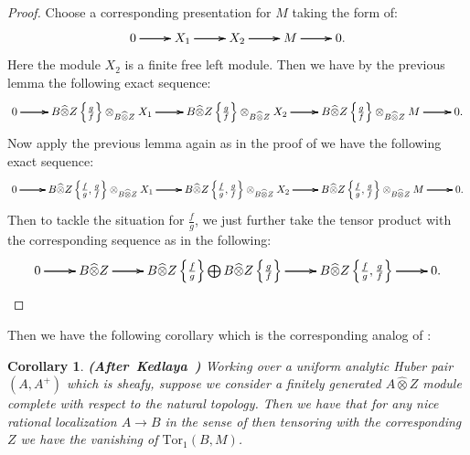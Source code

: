 \documentclass[12pt]{amsart}
\newtheorem{corollary}[theorem]{Corollary}
\theoremstyle{definition}
\numberwithin{equation}{section}
\begin{document}
\begin{proof}
Choose a corresponding presentation for $M$ taking the form of:
\[
\xymatrix@C+0pc@R+0pc{
0 \ar[r] \ar[r] \ar[r] &X_1 \ar[r] \ar[r] \ar[r] &X_2\ar[r] \ar[r] \ar[r] &M \ar[r] \ar[r] \ar[r] &0.
}
\]
Here the module $X_2$ is a finite free left module. Then we have by the previous lemma the following exact sequence:
\[
\xymatrix@C+0pc@R+0pc{
0 \ar[r] \ar[r] \ar[r] &B\widehat{\otimes}Z\left\{\frac{g}{f}\right\}\otimes_{B\widehat{\otimes}Z}X_1 \ar[r] \ar[r] \ar[r] &B\widehat{\otimes}Z\left\{\frac{g}{f}\right\}\otimes_{B\widehat{\otimes}Z}X_2 \ar[r] \ar[r] \ar[r] &B\widehat{\otimes}Z\left\{\frac{g}{f}\right\}\otimes_{B\widehat{\otimes}Z}M \ar[r] \ar[r] \ar[r] &0.
}
\]	
Now apply the previous lemma again as in the proof of \cite[Lemma 1.9.4]{Ked2} we have the following exact sequence:
\[
\xymatrix@C+0pc@R+0pc{
0 \ar[r] \ar[r] \ar[r] &B\widehat{\otimes}Z\left\{\frac{f}{g},\frac{g}{f}\right\}\otimes_{B\widehat{\otimes}Z}X_1 \ar[r] \ar[r] \ar[r] &B\widehat{\otimes}Z\left\{\frac{f}{g},\frac{g}{f}\right\}\otimes_{B\widehat{\otimes}Z}X_2 \ar[r] \ar[r] \ar[r] &B\widehat{\otimes}Z\left\{\frac{f}{g},\frac{g}{f}\right\}\otimes_{B\widehat{\otimes}Z}M \ar[r] \ar[r] \ar[r] &0.
}
\]	
Then to tackle the situation for $\frac{f}{g}$, we just further take the tensor product with the corresponding sequence as in the following:
\[
\xymatrix@C+0pc@R+0pc{
0 \ar[r] \ar[r] \ar[r] &B\widehat{\otimes}Z \ar[r] \ar[r] \ar[r] &B\widehat{\otimes}Z\left\{\frac{f}{g}\right\}\bigoplus B\widehat{\otimes}Z\left\{\frac{g}{f}\right\} \ar[r] \ar[r] \ar[r] &B\widehat{\otimes}Z\left\{\frac{f}{g},\frac{g}{f}\right\} \ar[r] \ar[r] \ar[r] &0.
}
\]
\end{proof}



\indent Then we have the following corollary which is the corresponding analog of \cite[Corollary 1.9.5]{Ked2}:


\begin{corollary}\mbox{\bf{(After Kedlaya \cite[Corollary 1.9.5]{Ked2})}}
Working over a uniform analytic Huber pair $(A,A^+)$ which is sheafy, suppose we consider a finitely generated $A\widehat{\otimes}Z$ module complete with respect to the natural topology. Then we have that for any nice rational localization $A\rightarrow B$ in the sense of \cite[Definition 1.9.1]{Ked2} then tensoring with the corresponding $Z$ we have the vanishing of $\mathrm{Tor}_1(B,M)$.
	
\end{corollary}
\end{document}
